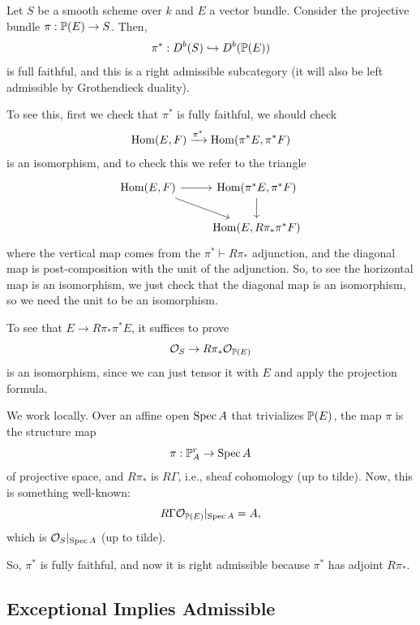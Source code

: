 \documentclass[12pt]{article}
\begin{document}
\begin{eg}
    Let $S$ be a smooth scheme over $k$ and $E$ a vector bundle. Consider the projective bundle $\pi: \P(E) \to S$. Then,
    \[\pi^*: D^b(S) \hookrightarrow D^b(\P(E))\]
    is full faithful, and this is a right admissible subcategory (it will also be left admissible by Grothendieck duality).

    To see this, first we check that $\pi^*$ is fully faithful, we should check
    \[\Hom(E,F) \xrightarrow{\pi^*} \Hom(\pi^* E, \pi^* F)\]
    is an isomorphism, and to check this we refer to the triangle
    \[\begin{tikzcd}
        \Hom(E,F) \rar \ar[dr] & \Hom(\pi^* E, \pi^* F) \dar\\
        & \Hom(E, R\pi_* \pi^* F)
    \end{tikzcd}\]
    where the vertical map comes from the $\pi^* \vdash R\pi_*$ adjunction, and the diagonal map is post-composition with the unit of the adjunction. So, to see the horizontal map is an isomorphism, we just check that the diagonal map is an isomorphism, so we need the unit to be an isomorphism.

    To see that $E \to R\pi_* \pi^* E$, it suffices to prove
    \[\cO_S \to R\pi_* \cO_{\P(E)}\]
    is an isomorphism, since we can just tensor it with $E$ and apply the projection formula.
    
    We work locally. Over an affine open $\Spec A$ that trivializes $\P(E)$, the map $\pi$ is the structure map
    \[\pi: \P^r_A \to \Spec A\]
    of projective space, and $R\pi_*$ is $R\Gamma$, i.e., sheaf cohomology (up to tilde). Now, this is something well-known:
    \[R\Gamma \cO_{\P(E)}|_{\Spec A} = A,\]
    which is $\cO_S|_{\Spec A}$ (up to tilde).

    So, $\pi^*$ is fully faithful, and now it is right admissible because $\pi^*$ has adjoint $R\pi_*$.
\end{eg}


\subsection{Exceptional Implies Admissible}
\end{document}
